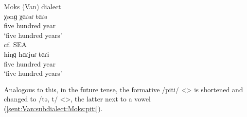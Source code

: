 \begin{table}[H]
	\centering
	\caption{Change from Classical Armenian /i, e/ <> to /ə/ <> in the Moks subdialect of the Van dialect}
	\label{tab:Van:subdialect:Moks:schwa}
\end{table} 

\begin{exe}
	\ex \label{sent:Van:subdialect:Moks:schwa}\begin{xlist}
		\ex Moks (Van) dialect  \\
		\gll
		χənɡ χɑɾəɾ tɑɾə \\
		five hundred year \\
		\trans `five hundred years' \\
	\ex cf. SEA \\
\gll
hiŋɡ hɑɾjuɾ tɑɾi \\
five hundred year \\
\trans `five hundred years' \\

	\end{xlist}
\end{exe}


Analogous to this, in the future tense, the formative /piti/ <> is shortened and changed to /tə, t/ <>, the latter next to a vowel (\ref{sent:Van:subdialect:Moks:piti}). 

